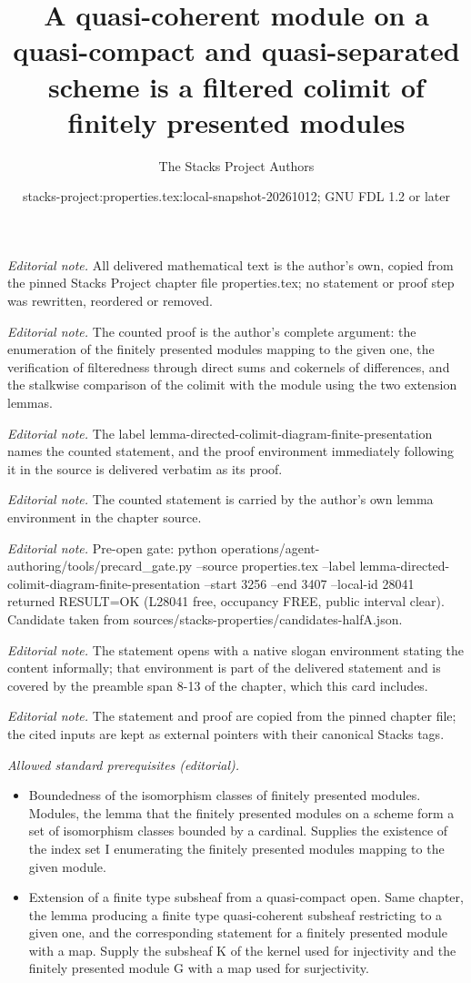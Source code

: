 \documentclass[10pt,a4paper]{amsart}
\title{A quasi-coherent module on a quasi-compact and quasi-separated scheme is a filtered colimit of finitely presented modules}
\author{The Stacks Project Authors}
\date{stacks-project:properties.tex:local-snapshot-20261012; GNU FDL 1.2 or later}
\theoremstyle{plain}
\theoremstyle{definition}
\theoremstyle{remark}
\numberwithin{equation}{subsection}
\begin{document}
\maketitle
\noindent\textit{Editorial note.} All delivered mathematical text is the author's own, copied from the pinned Stacks Project chapter file properties.tex; no statement or proof step was rewritten, reordered or removed.\par\medskip
\noindent\textit{Editorial note.} The counted proof is the author's complete argument: the enumeration of the finitely presented modules mapping to the given one, the verification of filteredness through direct sums and cokernels of differences, and the stalkwise comparison of the colimit with the module using the two extension lemmas.\par\medskip
\noindent\textit{Editorial note.} The label lemma-directed-colimit-diagram-finite-presentation names the counted statement, and the proof environment immediately following it in the source is delivered verbatim as its proof.\par\medskip
\noindent\textit{Editorial note.} The counted statement is carried by the author's own lemma environment in the chapter source.\par\medskip
\noindent\textit{Editorial note.} Pre-open gate: python operations/agent-authoring/tools/precard\_gate.py --source properties.tex --label lemma-directed-colimit-diagram-finite-presentation --start 3256 --end 3407 --local-id 28041 returned RESULT=OK (L28041 free, occupancy FREE, public interval clear). Candidate taken from sources/stacks-properties/candidates-halfA.json.\par\medskip
\noindent\textit{Editorial note.} The statement opens with a native slogan environment stating the content informally; that environment is part of the delivered statement and is covered by the preamble span 8-13 of the chapter, which this card includes.\par\medskip
\noindent\textit{Editorial note.} The statement and proof are copied from the pinned chapter file; the cited inputs are kept as external pointers with their canonical Stacks tags.\par\medskip
\noindent\textit{Allowed standard prerequisites (editorial).}\begin{itemize}
\item Boundedness of the isomorphism classes of finitely presented modules. Modules, the lemma that the finitely presented modules on a scheme form a set of isomorphism classes bounded by a cardinal. Supplies the existence of the index set I enumerating the finitely presented modules mapping to the given module.
\item Extension of a finite type subsheaf from a quasi-compact open. Same chapter, the lemma producing a finite type quasi-coherent subsheaf restricting to a given one, and the corresponding statement for a finitely presented module with a map. Supply the subsheaf K of the kernel used for injectivity and the finitely presented module G with a map used for surjectivity.
\end{itemize}\medskip
\end{document}
